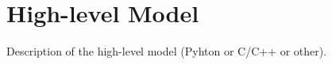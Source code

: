 \chapter{High-level Model}\label{chapter:2}
Description of the high-level model (Pyhton or C/C++ or other).
